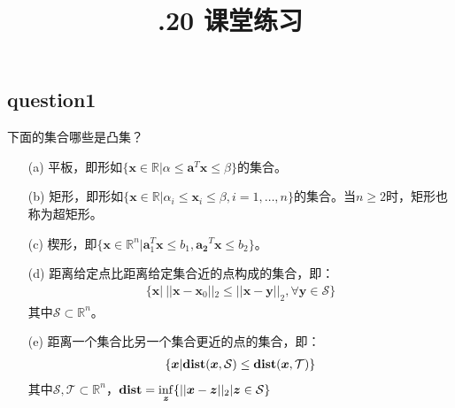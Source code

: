 \documentclass[12pt,a4paper]{ctexart}
\title{\heiti 2023.12.20 课堂练习}
\date{}
\newcommand{\bs}[1]{\boldsymbol{#1}}
\newcommand{\R}{\mathbb{R}}
\begin{document}
\maketitle
\subsection*{question1}
下面的集合哪些是凸集？
\begin{itemize}
    \item[(a)] 平板，即形如$\{\bs{x}\in\R|\alpha \leq \bs{a}^T\bs{x} \leq \beta\}$的集合。
    \item[(b)] 矩形，即形如$\{\bs{x} \in \R | \alpha_i \leq \bs{x}_i \leq \beta,i=1,\ldots,n\}$的集合。当$n \geq 2$时，矩形也称为超矩形。
    \item[(c)] 楔形，即$\{\bs{x}\in\R^n|\bs{a}_1^T\bs{x}\leq b_1,\bs{a_2}^T\bs{x}\leq b_2\}$。
    \item[(d)] 距离给定点比距离给定集合近的点构成的集合，即：
    \begin{align*}
    \{\bs{x}|\ ||\bs{x}-\bs{x}_0||_2 \leq ||\bs{x}-\bs{y}||_2,\forall \bs{y} \in \mathcal{S}\}
    \end{align*}
    其中$\mathcal{S} \subset \R^n$。
    \item[(e)] 距离一个集合比另一个集合更近的点的集合，即：
    \begin{align*}
    \{\bs{x}|\bs{\rm{dist}}(\bs{x},\mathcal{S})\leq \bs{\rm{dist}}(\bs{x},\mathcal{T})\}
    \end{align*}
    其中$\mathcal{S},\mathcal{T} \subset \R^n$，$\bs{\rm{dist}}=\inf\limits_{\bs{z}}\{||\bs{x}-\bs{z}||_2|\bs{z} \in \mathcal{S}\}$
\end{itemize}
\end{document}
